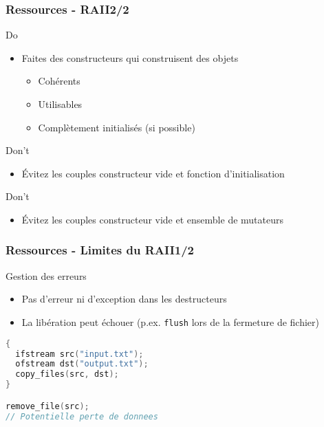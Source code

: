 \documentclass[C++.tex]{subfiles}
\begin{document}
\begin{frame}
	\frametitle{Ressources - RAII\titlehfill{}2/2}
	\begin{exampleblock}{Do}
		\begin{itemize}
			\item Faites des constructeurs qui construisent des objets
			\begin{itemize}
				\item Cohérents
				\item Utilisables
				\item Complètement initialisés (si possible)
			\end{itemize}
		\end{itemize}
	\end{exampleblock}

	\begin{alertblock}{Don't}
		\begin{itemize}
			\item Évitez les couples constructeur \og vide\fg{} et fonction d'initialisation
		\end{itemize}
	\end{alertblock}

	\begin{alertblock}{Don't}
		\begin{itemize}
			\item Évitez les couples constructeur \og vide\fg{} et ensemble de mutateurs
		\end{itemize}

	\end{alertblock}
\end{frame}

\begin{frame}[fragile]
	\frametitle{Ressources - Limites du RAII\titlehfill{}1/2}
	\begin{alertblock}{Gestion des erreurs}
		\begin{itemize}
			\item Pas d'erreur ni d'exception dans les destructeurs
			\item La libération peut échouer (p.ex. \lstinline|flush| lors de la fermeture de fichier)
		\end{itemize}
	\end{alertblock}

	\begin{lstlisting}[language=C++]
{
  ifstream src("input.txt");
  ofstream dst("output.txt");
  copy_files(src, dst);
}

remove_file(src);
// Potentielle perte de donnees\end{lstlisting}

\end{frame}
\end{document}
